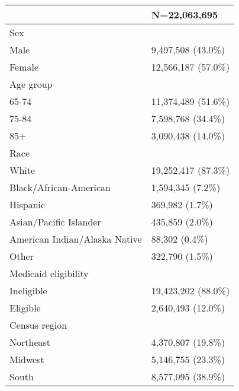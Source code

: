 \begin{table}[ht]
\centering
\begin{tabular}{ll}
  \hline
 & N=22,063,695 \\ 
  \hline
Sex &  \\ 
    \hspace{10pt}Male & 9,497,508 (43.0\%) \\ 
    \hspace{10pt}Female & 12,566,187 (57.0\%) \\ 
  Age group &  \\ 
    \hspace{10pt}65-74 & 11,374,489 (51.6\%) \\ 
    \hspace{10pt}75-84 & 7,598,768 (34.4\%) \\ 
    \hspace{10pt}85+ & 3,090,438 (14.0\%) \\ 
  Race &  \\ 
    \hspace{10pt}White & 19,252,417 (87.3\%) \\ 
    \hspace{10pt}Black/African-American & 1,594,345 (7.2\%) \\ 
    \hspace{10pt}Hispanic & 369,982 (1.7\%) \\ 
    \hspace{10pt}Asian/Pacific Islander & 435,859 (2.0\%) \\ 
    \hspace{10pt}American Indian/Alaska Native & 88,302 (0.4\%) \\ 
    \hspace{10pt}Other & 322,790 (1.5\%) \\ 
  Medicaid eligibility &  \\ 
    \hspace{10pt}Ineligible & 19,423,202 (88.0\%) \\ 
    \hspace{10pt}Eligible & 2,640,493 (12.0\%) \\ 
  Census region &  \\ 
    \hspace{10pt}Northeast & 4,370,807 (19.8\%) \\ 
    \hspace{10pt}Midwest & 5,146,755 (23.3\%) \\ 
    \hspace{10pt}South & 8,577,095 (38.9\%) \\ 

\end{tabular}
\end{table}
